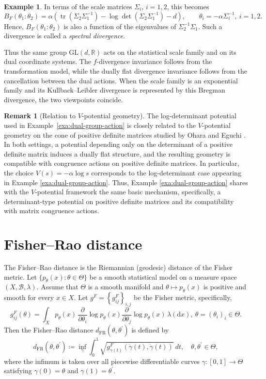 \documentclass[a4paper, reqno, 11pt]{article}
\theoremstyle{definition}
\newtheorem{Rem}[Thm]{Remark}
\newtheorem{Exa}[Thm]{Example}
\def\GL{\mathrm{GL}}
\def\dx{{\mathrm{d}x}}
\def\FR{{\mathrm{FR}}}
\begin{document}
\begin{Exa}
In terms of the scale matrices $\Sigma_i$, $i=1,2$, this becomes
\[ B_F(\theta_1:\theta_2) = \alpha\left(\operatorname{tr}(\Sigma_2\Sigma_1^{-1}) -\log\det(\Sigma_2\Sigma_1^{-1})-d
\right), \qquad \theta_i = -\alpha\Sigma_i^{-1}, \ i = 1,2. \]
Hence, $B_F (\theta_1:\theta_2)$ is also a function of the eigenvalues of $\Sigma_2^{-1}\Sigma_1$. 
Such a divergence is called a {\it spectral divergence}.

Thus the same group $\GL(d,\mathbb{R})$ acts on the statistical scale family and on its dual coordinate systems. 
The $f$-divergence invariance follows from the transformation model, while the dually flat divergence invariance follows from the cancellation between the dual actions. 
When the scale family is an exponential family and its Kullback--Leibler divergence is represented by this Bregman divergence, the two viewpoints coincide. 
\end{Exa}

\begin{Rem}[Relation to $V$-potential geometry]
The log-determinant potential used in Example~\ref{exa:dual-group-action} is closely related to the
$V$-potential geometry on the cone of positive definite matrices studied by Ohara and Eguchi \cite{ohara-eguchi, ohara-eguchi-2014}.  
In both settings, a potential depending only on the determinant of a positive definite matrix induces a dually flat structure, and the resulting geometry is compatible with congruence actions on positive definite matrices.
In particular, the choice $V(s) = -\alpha \log s$ corresponds to the log-determinant case appearing in Example \ref{exa:dual-group-action}.  
Thus, Example \ref{exa:dual-group-action} shares with the $V$-potential framework the same basic mechanism, specifically, a determinant-type potential on positive definite matrices and its compatibility with matrix congruence actions.
\end{Rem}


\section{Fisher--Rao distance}\label{sec:FRdist}


The Fisher--Rao distance is the Riemannian (geodesic) distance of the Fisher metric. 
Let $\{p_{\theta} (x) \colon \theta \in \Theta\}$ be a smooth statistical model on a measure space $(X, \mathcal{B}, \lambda)$. 
Assume that $\Theta$ is a smooth manifold and $\theta \mapsto p_{\theta}(x)$ is positive and smooth for every $x \in X$. 
Let $g^{F} = \left\{g^{F}_{ij} \right\}_{i,j}$ be the Fisher metric, specifically, 
\[ g^{F}_{ij}(\theta) = \int_X p_{\theta}(x) \, \frac{\partial}{\partial \theta_i} \log p_{\theta}(x)  \frac{\partial}{\partial \theta_j} \log p_{\theta}(x) \, \lambda(\dx), \ \theta = (\theta_i)_i \in \Theta.  \]
Then the Fisher--Rao distance $d_{\FR}(\theta, \theta^{\prime})$ is defined by 
\[ d_{\FR}(\theta, \theta^{\prime}) \coloneqq  \inf_{\gamma} \int_0^1 \sqrt{g^{F}_{\gamma(t)} (\dot{\gamma}(t), \dot{\gamma}(t))} \ dt,  \quad \theta, \theta^{\prime} \in \Theta,   \]
where the infimum is taken over all piecewise differentiable curves $\gamma \colon [0,1] \to \Theta$ satisfying $\gamma(0) = \theta$ and $\gamma(1) = \theta^{\prime}$. 
\end{document}
